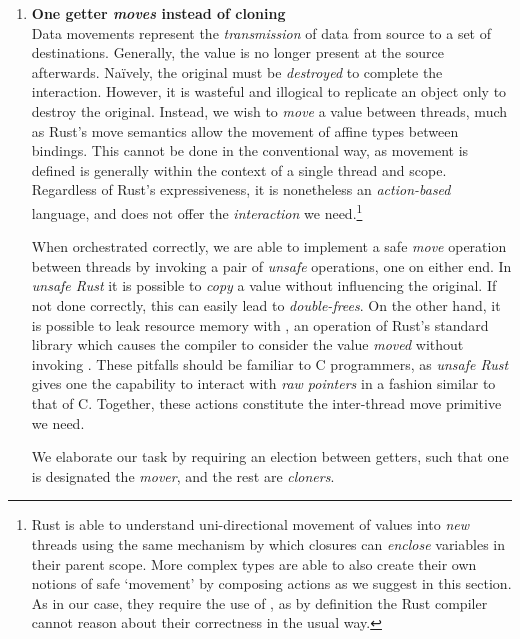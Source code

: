 \begin{enumerate}
	\item \textbf{One getter \textit{moves} instead of cloning}\\
	Data movements represent the \textit{transmission} of data from source to a set of destinations. Generally, the value is no longer present at the source afterwards. Na\"ively, the original must be \textit{destroyed} to complete the interaction. However, it is wasteful and illogical to replicate an object only to destroy the original. Instead, we wish to \textit{move} a value between threads, much as Rust's move semantics allow the movement of affine types between bindings. This cannot be done in the conventional way, as movement is defined is generally within the context of a single thread and scope. Regardless of Rust's expressiveness, it is nonetheless an \textit{action-based} language, and does not offer the \textit{interaction} we need.\footnote{Rust is able to understand uni-directional movement of values into \textit{new} threads using the same mechanism by which closures can \textit{enclose} variables in their parent scope. More complex types are able to also create their own notions of safe `movement' by composing actions as we suggest in this section. As in our case, they require the use of , as by definition the Rust compiler cannot reason about their correctness in the usual way.}
	
	When orchestrated correctly, we are able to implement a safe \textit{move} operation between threads by invoking a pair of \textit{unsafe} operations, one on either end. In \textit{unsafe Rust} it is possible to \textit{copy} a value without influencing the original. If not done correctly, this can easily lead to \textit{double-frees}. On the other hand, it is possible to leak resource memory with , an operation of Rust's standard library which causes the compiler to consider the value \textit{moved} without invoking . These pitfalls should be familiar to C programmers, as \textit{unsafe Rust} gives one the capability to interact with \textit{raw pointers} in a fashion similar to that of C. Together, these actions constitute the inter-thread move primitive we need.
	
	We elaborate our task by requiring an election between getters, such that one is designated the \textit{mover}, and the rest are \textit{cloners}. 
	

\end{enumerate}
